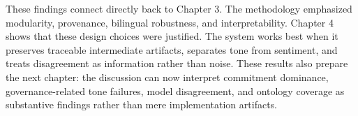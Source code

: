 \documentclass[english, online, cse, master]{dithesis}
\begin{document}
These findings connect directly back to Chapter 3. The methodology emphasized modularity, provenance, bilingual robustness, and interpretability. Chapter 4 shows that these design choices were justified. The system works best when it preserves traceable intermediate artifacts, separates tone from sentiment, and treats disagreement as information rather than noise. These results also prepare the next chapter: the discussion can now interpret commitment dominance, governance-related tone failures, model disagreement, and ontology coverage as substantive findings rather than mere implementation artifacts.
\end{document}
